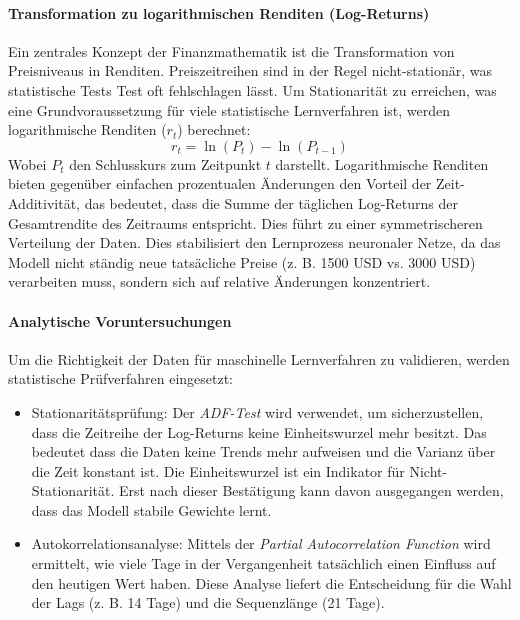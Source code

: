 \paragraph{Transformation zu logarithmischen Renditen (Log-Returns)}
Ein zentrales Konzept der Finanzmathematik ist die Transformation von Preisniveaus in Renditen. Preiszeitreihen sind in der Regel nicht-stationär, was statistische Tests Test oft fehlschlagen lässt. Um Stationarität zu erreichen, was eine Grundvoraussetzung für viele statistische Lernverfahren ist, werden logarithmische Renditen ($r_t$) berechnet:
\begin{equation}
    r_t = \ln(P_t) - \ln(P_{t-1})
\end{equation}
Wobei $P_t$ den Schlusskurs zum Zeitpunkt $t$ darstellt. Logarithmische Renditen bieten gegenüber einfachen prozentualen Änderungen den Vorteil der Zeit-Additivität, das bedeutet, dass die Summe der täglichen Log-Returns der Gesamtrendite des Zeitraums entspricht. Dies führt zu einer symmetrischeren Verteilung der Daten. Dies stabilisiert den Lernprozess neuronaler Netze, da das Modell nicht ständig neue tatsäcliche Preise (z. B. 1500 USD vs. 3000 USD) verarbeiten muss, sondern sich auf relative Änderungen konzentriert.

\paragraph{Analytische Voruntersuchungen}
Um die Richtigkeit der Daten für maschinelle Lernverfahren zu validieren, werden statistische Prüfverfahren eingesetzt:
\begin{itemize}
    \item Stationaritätsprüfung: Der \emph{ADF-Test} wird verwendet, um sicherzustellen, dass die Zeitreihe der Log-Returns keine Einheitswurzel mehr besitzt. Das bedeutet dass die Daten keine Trends mehr aufweisen und die Varianz über die Zeit konstant ist. Die Einheitswurzel ist ein Indikator für Nicht-Stationarität. Erst nach dieser Bestätigung kann davon ausgegangen werden, dass das Modell stabile Gewichte lernt.
    \item Autokorrelationsanalyse: Mittels der \emph{Partial Autocorrelation Function} wird ermittelt, wie viele Tage in der Vergangenheit tatsächlich einen Einfluss auf den heutigen Wert haben. Diese Analyse liefert die Entscheidung für die Wahl der Lags (z. B. 14 Tage) und die Sequenzlänge (21 Tage).
\end{itemize}


